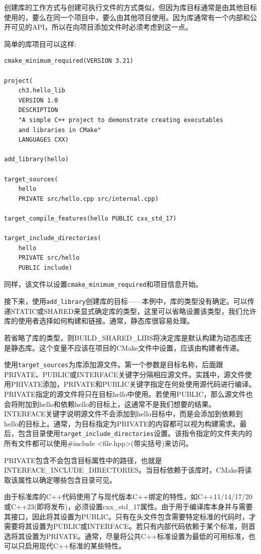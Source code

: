 
创建库的工作方式与创建可执行文件的方式类似，但因为库目标通常是由其他目标使用的，要么在同一个项目中，要么由其他项目使用。因为库通常有一个内部和公开可见的API，所以在向项目添加文件时必须考虑到这一点。

简单的库项目可以这样:

\begin{lstlisting}[style=styleCMake]
cmake_minimum_required(VERSION 3.21)

project(
	ch3.hello_lib
	VERSION 1.0
	DESCRIPTION
	"A simple C++ project to demonstrate creating executables
	and libraries in CMake"
	LANGUAGES CXX)
	
add_library(hello)

target_sources(
	hello
	PRIVATE src/hello.cpp src/internal.cpp)
	
target_compile_features(hello PUBLIC cxx_std_17)

target_include_directories(
	hello
	PRIVATE src/hello
	PUBLIC include)
\end{lstlisting}

同样，该文件以设置\texttt{cmake\_minimum\_required}和项目信息开始。

接下来，使用\texttt{add\_library}创建库的目标——本例中，库的类型没有确定。可以传递STATIC或SHARED来显式确定库的类型，这里可以省略设置该类型，我们允许库的使用者选择如何构建和链接。通常，静态库很容易处理。

若省略了库的类型，则BUILD\_SHARED\_LIBS将决定库是默认构建为动态库还是静态库。这个变量不应该在项目的CMake文件中设置，应该由构建者传递。

使用\texttt{target\_sources}为库添加源文件。第一个参数是目标名称，后面跟PRIVATE、PUBLIC或INTERFACE关键字分隔相应源文件。实践中，源文件使用PRIVATE添加，PRIVATE和PUBLIC关键字指定在何处使用源代码进行编译。PRIVATE指定的源文件将只在目标hello中使用。若使用PUBLIC，那么源文件也会将附加到hello和依赖hello的目标上，这通常不是我们想要的结果。INTERFACE关键字说明源文件不会添加到hello目标中，而是会添加到依赖到hello的目标上。通常，为目标指定为PRIVATE的内容都可以视为构建需求。最后，包含目录使用\texttt{target\_include\_directories}设置。该指令指定的文件夹内的所有文件都可以使用\#include <file.hpp>(带尖括号)来访问。

PRIVATE包含不会包含目标属性中的路径，也就是INTERFACE\_INCLUDE\_DIRECTORIES。当目标依赖于该库时，CMake将读取该属性以确定哪些包含目录可见。

由于标准库的C++代码使用了与现代版本C++绑定的特性，如C++11/14/17/20或C++23(即将发布)，必须设置cxx\_std\_17属性。由于用于编译库本身并与需要其接口，因此将其设置为PUBLIC。只有在头文件包含需要特定标准的代码时，才需要将其设置为PUBLIC或INTERFACE。若只有内部代码依赖于某个标准，则首选将其设置为PRIVATE。通常，尽量将公共C++标准设置为最低的可用标准，也可以只启用现代C++标准的某些特性。

